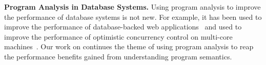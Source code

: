 \textbf{Program Analysis in Database Systems.}
Using program analysis to improve the performance of database systems is not
new. For example, it has been used to improve the performance of
database-backed web applications~\cite{cheung2014using, wu2016transaction,
ramachandra2012program} and used to improve the performance of optimistic
concurrency control on multi-core machines~\cite{wu2016transaction}. Our work
on \invariantconfluence{} continues the theme of using program analysis to reap
the performance benefits gained from understanding program semantics.
